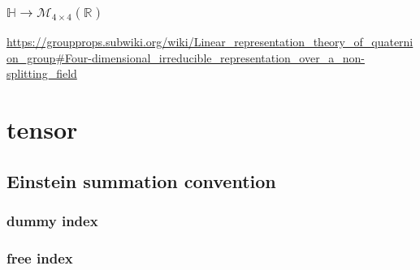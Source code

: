 \documentclass[
]{book}
\theoremstyle{definition}
\theoremstyle{definition}
\theoremstyle{definition}
\theoremstyle{definition}
\theoremstyle{remark}
\begin{document}
\subsection{\texorpdfstring{\(\mathbb{H}\rightarrow\mathcal{M}_{4\times4}\left(\mathbb{R}\right)\)}{\textbackslash mathbb\{H\}\textbackslash rightarrow\textbackslash mathcal\{M\}\_\{4\textbackslash times4\}\textbackslash left(\textbackslash mathbb\{R\}\textbackslash right)}}\label{mathbbhrightarrowmathcalm_4times4leftmathbbrright}

\url{https://groupprops.subwiki.org/wiki/Linear_representation_theory_of_quaternion_group\#Four-dimensional_irreducible_representation_over_a_non-splitting_field}

\chapter{tensor}\label{tensor}

\section{Einstein summation convention}\label{einstein-summation-convention}

\subsection{dummy index}\label{dummy-index}

\subsection{free index}\label{free-index}
\end{document}
